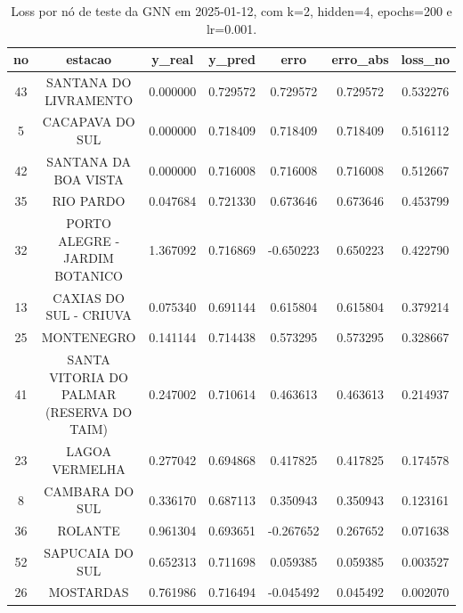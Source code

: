 \begin{table}[h]
\centering
\caption{Loss por nó de teste da GNN em 2025-01-12, com k=2, hidden=4, epochs=200 e lr=0.001.}
\label{tab:gnn_loss_nodes_k2_hidden4}
\begin{tabular}{ccccccc}
\toprule
no & estacao & y\_real & y\_pred & erro & erro\_abs & loss\_no \\
\midrule
43 & SANTANA DO LIVRAMENTO & 0.000000 & 0.729572 & 0.729572 & 0.729572 & 0.532276 \\
5 & CACAPAVA DO SUL & 0.000000 & 0.718409 & 0.718409 & 0.718409 & 0.516112 \\
42 & SANTANA DA BOA VISTA & 0.000000 & 0.716008 & 0.716008 & 0.716008 & 0.512667 \\
35 & RIO PARDO & 0.047684 & 0.721330 & 0.673646 & 0.673646 & 0.453799 \\
32 & PORTO ALEGRE - JARDIM BOTANICO & 1.367092 & 0.716869 & -0.650223 & 0.650223 & 0.422790 \\
13 & CAXIAS DO SUL - CRIUVA & 0.075340 & 0.691144 & 0.615804 & 0.615804 & 0.379214 \\
25 & MONTENEGRO & 0.141144 & 0.714438 & 0.573295 & 0.573295 & 0.328667 \\
41 & SANTA VITORIA DO PALMAR (RESERVA DO TAIM) & 0.247002 & 0.710614 & 0.463613 & 0.463613 & 0.214937 \\
23 & LAGOA VERMELHA & 0.277042 & 0.694868 & 0.417825 & 0.417825 & 0.174578 \\
8 & CAMBARA DO SUL & 0.336170 & 0.687113 & 0.350943 & 0.350943 & 0.123161 \\
36 & ROLANTE & 0.961304 & 0.693651 & -0.267652 & 0.267652 & 0.071638 \\
52 & SAPUCAIA DO SUL & 0.652313 & 0.711698 & 0.059385 & 0.059385 & 0.003527 \\
26 & MOSTARDAS & 0.761986 & 0.716494 & -0.045492 & 0.045492 & 0.002070 \\
\bottomrule
\end{tabular}
\end{table}
